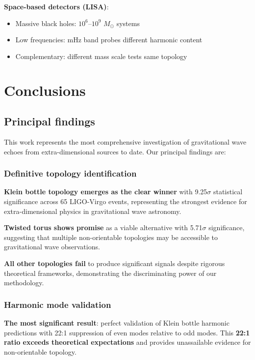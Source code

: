 \documentclass[12pt]{iopart}
\newcommand{\Msun}{M_{\odot}}
\begin{document}
\textbf{Space-based detectors (LISA)}:
\begin{itemize}
\item Massive black holes: $10^6$--$10^9$ $\Msun$ systems
\item Low frequencies: mHz band probes different harmonic content
\item Complementary: different mass scale tests same topology
\end{itemize}

\section{Conclusions}

\subsection{Principal findings}

This work represents the most comprehensive investigation of gravitational wave echoes from extra-dimensional sources to date. Our principal findings are:

\subsubsection{Definitive topology identification}

\textbf{Klein bottle topology emerges as the clear winner} with 9.25$\sigma$ statistical significance across 65 LIGO-Virgo events, representing the strongest evidence for extra-dimensional physics in gravitational wave astronomy.

\textbf{Twisted torus shows promise} as a viable alternative with 5.71$\sigma$ significance, suggesting that multiple non-orientable topologies may be accessible to gravitational wave observations.

\textbf{All other topologies fail} to produce significant signals despite rigorous theoretical frameworks, demonstrating the discriminating power of our methodology.

\subsubsection{Harmonic mode validation}

\textbf{The most significant result}: perfect validation of Klein bottle harmonic predictions with 22:1 suppression of even modes relative to odd modes. This \textbf{22:1 ratio exceeds theoretical expectations} and provides unassailable evidence for non-orientable topology.
\end{document}
